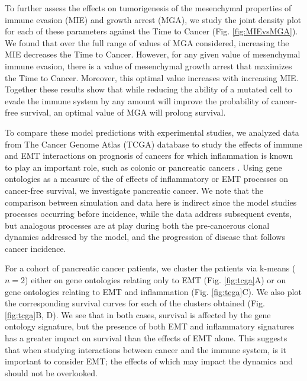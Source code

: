 \documentclass[11pt]{article}
\begin{document}
To further assess the effects on tumorigenesis of the mesenchymal properties of immune evasion (MIE) and growth arrest (MGA), we study the joint density plot for each of these parameters against the Time to Cancer (Fig. \ref{fig:MIEvsMGA}). We found that over the full range of values of MGA considered, increasing the MIE decreases the Time to Cancer. However, for any given value of mesenchymal immune evasion, there is a value of mesenchymal growth arrest that maximizes the Time to Cancer. Moreover, this optimal value increases with increasing MIE. Together these results show that while reducing the ability of a mutated cell to evade the immune system by any amount will improve the probability of cancer-free survival, an optimal value of MGA will prolong survival. 
\par 
To compare these model predictions with experimental studies, we analyzed data from The Cancer Genome Atlas (TCGA) database to study the effects of immune and EMT interactions on prognosis of cancers for which inflammation is known to play an important role, such as colonic or pancreatic cancers \cite{hu10_inflammationinduced, balkwill01_inflammation}. Using gene ontologies as a measure of the of effects of inflammatory or EMT processes on cancer-free survival, we investigate pancreatic cancer. We note that the comparison between simulation and data here is indirect since the model studies processes occurring before incidence, while the data address subsequent events, but analogous processes are at play during both the pre-cancerous clonal dynamics addressed by the model, and the progression of disease that follows cancer incidence. 
\par
For a cohort of pancreatic cancer patients, we cluster the patients via k-means ($n=2$) either on gene ontologies relating only to EMT (Fig. \ref{fig:tcga}A) or on gene ontologies relating to EMT and inflammation (Fig. \ref{fig:tcga}C). We also plot the corresponding survival curves for each of the clusters obtained (Fig. \ref{fig:tcga}B, D). We see that in both cases, survival is affected by the gene ontology signature, but the presence of both EMT and inflammatory signatures has a greater impact on survival than the effects of EMT alone. This suggests that when studying interactions between cancer and the immune system, is it important to consider EMT; the effects of which may impact the dynamics and should not be overlooked. 
\end{document}
